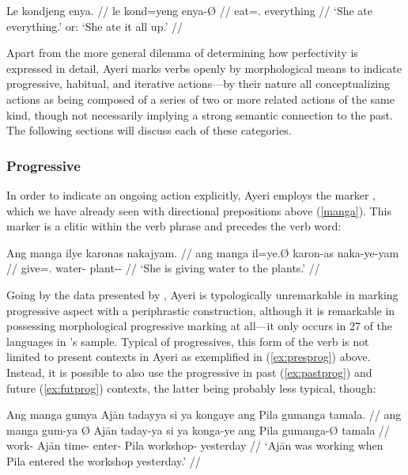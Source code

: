\ex\begingl
	\gla Le kondjeng enya. //
	\glb le kond=yeng enya-Ø //
	\glc \PatTI{} eat=\TsgF{}.\Aarg{} everything //
	\glft `She ate everything.' or: `She ate it all up.' //
\endgl\xe

Apart from the more general dilemma of determining how perfectivity is
expressed in detail, Ayeri marks verbs openly by morphological means to
indicate progressive, habitual, and iterative actions---by their nature all
conceptualizing actions as being composed of a series of two or more related
actions of the same kind, though not necessarily implying a strong semantic
connection to the past. The following sections will discuss each of these
categories.

\subsubsection{Progressive}

In order to indicate an ongoing action explicitly, Ayeri employs the marker
, which we have already seen with directional prepositions
above (\autoref{manga}). This marker is a clitic within the verb phrase and
precedes the verb word:

\ex\label{ex:presprog}\begingl
	\gla Ang manga ilye karonas nakajyam. //
	\glb ang manga il=ye.Ø karon-as naka-ye-yam //
	\glc \AgtT{} \Prog{} give=\TsgF{}.\Top{} water-\Parg{} 
		plant-\Pl{}-\Dat{} //
	\glft `She is giving water to the plants.' //
\endgl\xe

Going by the data presented by \citet[91]{dahl1985}, Ayeri is typologically
unremarkable in marking progressive aspect with a periphrastic construction,
although it is remarkable in possessing morphological progressive marking at
all---it only occurs in 27\pct{} of the languages in \citet{dahl1985}'s
sample. Typical of progressives, this form of the verb is not limited to
present contexts in Ayeri as exemplified in (\ref{ex:presprog}) above. Instead,
it is possible to also use the progressive in past (\ref{ex:pastprog}) and
future (\ref{ex:futprog}) contexts, the latter being probably less typical,
though:

\pex\label{ex:nonpresprog}
\a\label{ex:pastprog}\begingl
	\gla Ang manga gumya {} Ajān tadayya si ya kongaye ang Pila gumanga 
		tamala. //
	\glb ang manga gum-ya Ø Ajān taday-ya si ya konga-ye ang Pila 
		gumanga-Ø tamala //
	\glc \AgtT{} \Prog{} work-\Tsg{} \Top{} Ajān time-\Loc{} \Rel{} \LocT{} 
		enter-\TsgF{} \Aarg{} Pila workshop-\Top{} yesterday //
	\glft `Ajān was working when Pila entered the workshop yesterday.' //
\endgl

